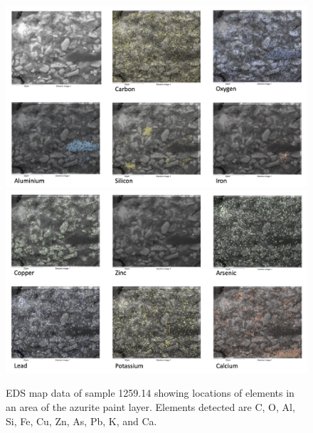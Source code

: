 \begin{figure}[H]
\centering
\begin{minipage}[t]{\linewidth}
  \centering
  \includegraphics[width=0.9\linewidth]{1259-14_mapdata_1}
\hfill
\includegraphics[width=0.9\linewidth]{1259-14_mapdata_2}
\hfill
\end{minipage}
\caption[EDS map data, sample 1259.14.]{EDS map data of sample 1259.14 showing locations of elements in an area of the azurite paint layer. Elements detected are C, O, Al, Si, Fe, Cu, Zn, As, Pb, K, and Ca.}
\label{fig:1259.14_mapdata}
\end{figure}

